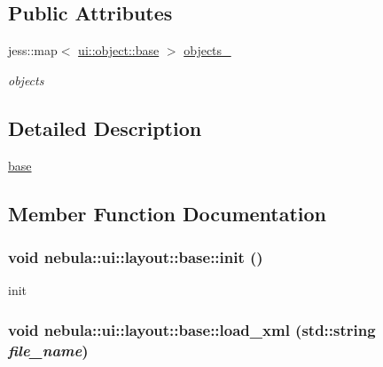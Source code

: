 \subsection*{Public Attributes}
\begin{DoxyCompactItemize}
\item 
jess::map$<$ \hyperlink{classnebula_1_1ui_1_1object_1_1base}{ui::object::base} $>$ \hyperlink{classnebula_1_1ui_1_1layout_1_1base_ab1251570bb5ba0d6725de30c77fc69eb}{objects\_\-}
\begin{DoxyCompactList}\small\item\em objects \item\end{DoxyCompactList}\end{DoxyCompactItemize}


\subsection{Detailed Description}
\hyperlink{classnebula_1_1ui_1_1layout_1_1base}{base} 

\subsection{Member Function Documentation}
\hypertarget{classnebula_1_1ui_1_1layout_1_1base_adfe11cc1bd625192a5bede3a51765280}{
\subsubsection[{init}]{\setlength{\rightskip}{0pt plus 5cm}void nebula::ui::layout::base::init ()}}
\label{classnebula_1_1ui_1_1layout_1_1base_adfe11cc1bd625192a5bede3a51765280}


init \hypertarget{classnebula_1_1ui_1_1layout_1_1base_a89450b82c4ad64508bc0254b0fc2e8fc}{
\subsubsection[{load\_\-xml}]{\setlength{\rightskip}{0pt plus 5cm}void nebula::ui::layout::base::load\_\-xml (std::string {\em file\_\-name})}}
\label{classnebula_1_1ui_1_1layout_1_1base_a89450b82c4ad64508bc0254b0fc2e8fc}


